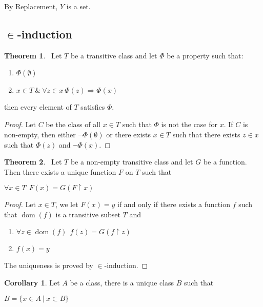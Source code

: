 \documentclass[8pt]{article}
\theoremstyle{definition}
\theoremstyle{definition}
\newtheorem{theorem}{Theorem}[section]
\theoremstyle{definition}
\theoremstyle{definition}
\theoremstyle{definition}
\theoremstyle{definition}
\theoremstyle{definition}
\theoremstyle{definition}
\theoremstyle{definition}
\theoremstyle{definition}
\theoremstyle{definition}
\theoremstyle{definition}
\theoremstyle{definition}
\theoremstyle{definition}
\newtheorem{col}{Corollary}[section]
\theoremstyle{question}
\begin{document}
By Replacement, $Y$ is a set.

\subsection{$\in$-induction}

\begin{theorem}~\label{in:ind}
  Let $T$ be a transitive class and let $\Phi$ be a property such that:
  \begin{enumerate}
    \item $\Phi(\emptyset)$
    \item $x \in T \: \& \: \forall z \in x \: \Phi(z) \Rightarrow \Phi(x)$
  \end{enumerate}
  then every element of $T$ satisfies $\Phi$.
\end{theorem}

\begin{proof}
  Let $C$ be the class of all $x \in T$ such that $\Phi$ is not the case for $x$.
  If $C$ is non-empty, then either $\neg \Phi(\emptyset)$ or there
  exists $x \in T$ such that there exists $z \in x$ such that $\Phi(z)$ and $\neg \Phi(x)$.
\end{proof}

\begin{theorem}~\label{in:rec}
  Let $T$ be a non-empty transitive class and let $G$ be a function. Then there exists a unique function $F$ on $T$ such that
  \begin{center}
  $\forall x \in T \:\: F(x) = G(F \upharpoonright x)$
  \end{center}
\end{theorem}

\begin{proof}
  Let $x \in T$, we let $F(x) = y$ if and only if there exists a function $f$ such that 
  $\operatorname{dom}(f)$ is a transitive subset $T$ and 
  \begin{enumerate}
    \item $\forall z \in \operatorname{dom}(f) \:\: f(z) = G(f \upharpoonright z)$
    \item $f(x) = y$
  \end{enumerate}

  The uniqueness is proved by $\in$-induction.
\end{proof}

\begin{col}
  Let $A$ be a class, there is a unique class $B$ such that
  \begin{center}
    $B = \{ x \in A \:| \: x \subset B \}$
  \end{center}
\end{col}
\end{document}
